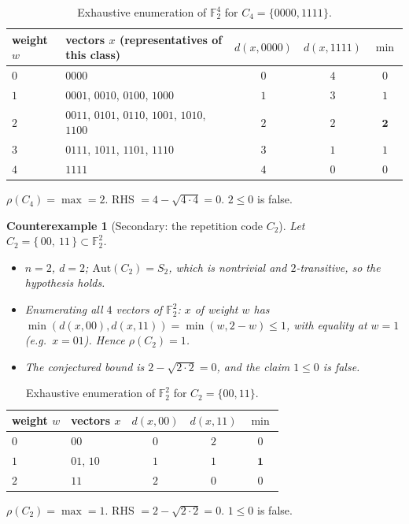 \documentclass[11pt]{article}
\newtheorem{counterexample}{Counterexample}
\theoremstyle{definition}
\begin{document}
\begin{table}[ht]
\centering
\caption{Exhaustive enumeration of $\mathbb{F}_2^4$ for
$C_4 = \{0000, 1111\}$.}
\label{tab:c4}
\begin{tabular}{llccc}
\toprule
weight $w$ & vectors $x$ (representatives of this class) & $d(x,0000)$ & $d(x,1111)$ & $\min$ \\
\midrule
$0$ & $0000$                          & $0$ & $4$ & $0$ \\
$1$ & $0001$, $0010$, $0100$, $1000$  & $1$ & $3$ & $1$ \\
$2$ & $0011$, $0101$, $0110$, $1001$, $1010$, $1100$ & $2$ & $2$ & $\mathbf{2}$ \\
$3$ & $0111$, $1011$, $1101$, $1110$  & $3$ & $1$ & $1$ \\
$4$ & $1111$                          & $4$ & $0$ & $0$ \\
\bottomrule
\end{tabular}

\medskip
$\rho(C_4) = \max = 2$. \quad RHS $= 4 - \sqrt{4\cdot 4} = 0$. \quad
$2 \le 0$ is false.
\end{table}

\begin{counterexample}[Secondary: the repetition code $C_2$]
\label{ex:c2}
Let $C_2 = \{\, 00,\ 11 \,\} \subset \mathbb{F}_2^2$.
\begin{itemize}
\item $n = 2$, $d = 2$; $\mathrm{Aut}(C_2) = S_2$, which is nontrivial and
$2$-transitive, so the hypothesis holds.
\item Enumerating all $4$ vectors of $\mathbb{F}_2^2$:
$x$ of weight $w$ has $\min(d(x,00), d(x,11)) = \min(w, 2-w) \le 1$,
with equality at $w=1$ (e.g.\ $x = 01$). Hence $\rho(C_2) = 1$.
\item The conjectured bound is $2 - \sqrt{2\cdot 2} = 0$, and the claim
$1 \le 0$ is false.
\end{itemize}
\end{counterexample}

\begin{table}[ht]
\centering
\caption{Exhaustive enumeration of $\mathbb{F}_2^2$ for
$C_2 = \{00, 11\}$.}
\label{tab:c2}
\begin{tabular}{llccc}
\toprule
weight $w$ & vectors $x$ & $d(x,00)$ & $d(x,11)$ & $\min$ \\
\midrule
$0$ & $00$        & $0$ & $2$ & $0$ \\
$1$ & $01$, $10$  & $1$ & $1$ & $\mathbf{1}$ \\
$2$ & $11$        & $2$ & $0$ & $0$ \\
\bottomrule
\end{tabular}

\medskip
$\rho(C_2) = \max = 1$. \quad RHS $= 2 - \sqrt{2\cdot 2} = 0$. \quad
$1 \le 0$ is false.
\end{table}
\end{document}
